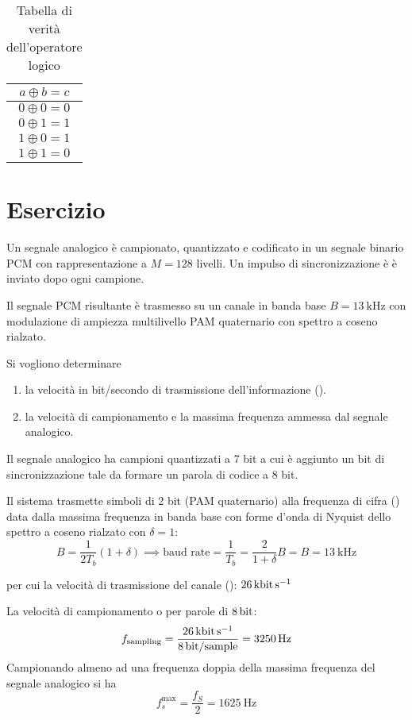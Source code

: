\begin{table}[!ht]
	\centering
	\begin{tabular}{c}
		$a \oplus b = c$ \\ \hline
		$0 \oplus 0 = 0$ \\
		$0 \oplus 1 = 1$ \\
		$1 \oplus 0 = 1$ \\
		$1 \oplus 1 = 0$
	\end{tabular}
	\caption{Tabella di verità dell'operatore logico }
\end{table}

\clearpage
\section{Esercizio}
\begin{esercizio}
Un segnale analogico è campionato, quantizzato e codificato in un segnale binario \ac{PCM} con rappresentazione a $M=128$ livelli. Un impulso di sincronizzazione è è inviato dopo ogni campione.

Il segnale \ac{PCM} risultante è trasmesso su un canale in banda base $B=\SI{13}{\kilo\hertz}$ con modulazione di ampiezza multilivello \ac{PAM} quaternario con spettro a coseno rialzato.

Si vogliono determinare
\begin{enumerate}
	\item la velocità in bit/secondo di trasmissione dell'informazione ().
	\item la velocità di campionamento e la massima frequenza ammessa dal segnale analogico.
\end{enumerate}

Il segnale analogico ha campioni quantizzati a 7 bit a cui è aggiunto un bit di sincronizzazione tale da formare un parola di codice a 8 bit.

Il sistema trasmette simboli di 2 bit (\ac{PAM} quaternario) alla frequenza di cifra () data dalla massima frequenza in banda base con forme d'onda di Nyquist dello spettro a coseno rialzato con $\delta=1$:
\[ B=\frac{1}{2 T_b}(1+\delta) \implies \text{baud rate}=\frac{1}{T_b}=\frac{2}{1+\delta}B=B=\SI{13}{\kilo\hertz}\]
\end{esercizio}
per cui la velocità di trasmissione del canale (): $\SI{26}{\kilo\bit\per\second}$

La velocità di campionamento o  per parole di $\SI{8}{\bit}$:
\[f_\text{sampling}=\frac{\SI{26}{\kilo\bit\per\second}}{\SI{8}{\bit\per sample}}=\SI{3250}{\hertz}\]
Campionando almeno ad una frequenza doppia della massima frequenza del segnale analogico si ha \[f_s^\text{max}=\frac{f_S}{2}=\SI{1625}{\hertz}\]